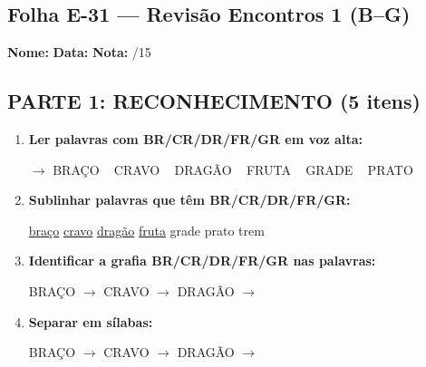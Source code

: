 \subsection{Folha E-31 --- Revisão Encontros 1 (B–G)}
\begin{exercicio}



\noindent\textbf{Nome:} \underline{\hspace{3.2cm}} \quad \textbf{Data:} \underline{\hspace{1.6cm}} \quad \textbf{Nota:} \underline{\hspace{0.9cm}}/15


\subsection*{PARTE 1: RECONHECIMENTO (5 itens)}

\begin{enumerate}

  \item \textbf{Ler palavras com BR/CR/DR/FR/GR em voz alta:}
  \begin{center}
  $\rightarrow$ BRAÇO ~ CRAVO ~ DRAGÃO ~ FRUTA ~ GRADE ~ PRATO
  \end{center}

  \item \textbf{Sublinhar palavras que têm BR/CR/DR/FR/GR:}

\begin{center}
  \uline{braço} \quad \uline{cravo} \quad \uline{dragão} \quad \uline{fruta} \quad grade \quad prato \quad trem
\end{center}

  \item \textbf{Identificar a grafia BR/CR/DR/FR/GR nas palavras:}
  \begin{center}
  BRAÇO $\rightarrow$ \underline{\hspace{1cm}} \quad CRAVO $\rightarrow$ \underline{\hspace{1cm}} \quad DRAGÃO $\rightarrow$ \underline{\hspace{1cm}}
  \end{center}

  \item \textbf{Separar em sílabas:}
  \begin{center}
  BRAÇO $\rightarrow$ \underline{\hspace{1.2cm}} \quad CRAVO $\rightarrow$ \underline{\hspace{1.2cm}} \quad DRAGÃO $\rightarrow$ \underline{\hspace{1.2cm}}
  \end{center}


\end{enumerate}
\end{exercicio}
